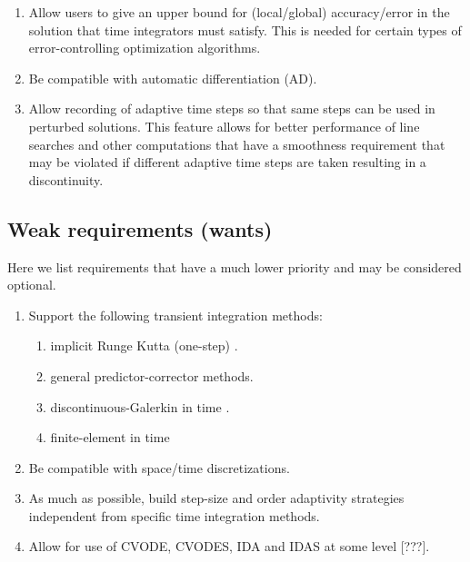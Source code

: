 \documentclass[pdf,ps2pdf,11pt]{SANDreport}
\begin{document}
\begin{enumerate}
{}\item Allow users to give an upper bound for (local/global) accuracy/error
in the solution that time integrators must satisfy.  This is needed for
certain types of error-controlling optimization algorithms.

{}\item Be compatible with automatic differentiation (AD).

{}\item Allow recording of adaptive time steps so that same steps can be used
in perturbed solutions.  This feature allows for better performance of line
searches and other computations that have a smoothness requirement that may be
violated if different adaptive time steps are taken resulting in a
discontinuity.

\end{enumerate}

\subsection{Weak requirements (wants)}

Here we list requirements that have a much lower priority and may be
considered optional.

\begin{enumerate}

{}\item Support the following transient integration methods:
  \begin{enumerate}
  {}\item implicit Runge Kutta (one-step) \cite{IRKMethods}.
  {}\item general predictor-corrector methods.
  {}\item discontinuous-Galerkin in time \cite{DGTime}.
  {}\item finite-element in time \cite{FETime}
  \end{enumerate}

{}\item Be compatible with space/time discretizations.

{}\item As much as possible, build step-size and order adaptivity strategies
independent from specific time integration methods.

{}\item Allow for use of CVODE, CVODES, IDA and IDAS at some level [???].

\end{enumerate}
\end{document}
